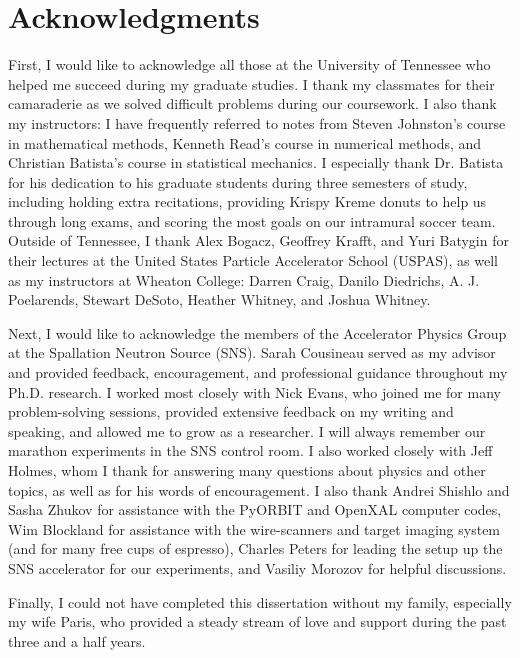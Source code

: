 \chapter*{Acknowledgments} 

First, I would like to acknowledge all those at the University of Tennessee who helped me succeed during my graduate studies. I thank my classmates for their camaraderie as we solved difficult problems during our coursework. I also thank my instructors: I have frequently referred to notes from Steven Johnston’s course in mathematical methods, Kenneth Read’s course in numerical methods, and Christian Batista’s course in statistical mechanics. I especially thank Dr. Batista for his dedication to his graduate students during three semesters of study, including holding extra recitations, providing Krispy Kreme donuts to help us through long exams, and scoring the most goals on our intramural soccer team. Outside of Tennessee, I thank Alex Bogacz, Geoffrey Krafft, and Yuri Batygin for their lectures at the United States Particle Accelerator School (USPAS), as well as my instructors at Wheaton College: Darren Craig, Danilo Diedrichs, A. J. Poelarends, Stewart DeSoto, Heather Whitney, and Joshua Whitney. 

Next, I would like to acknowledge the members of the Accelerator Physics Group at the Spallation Neutron Source (SNS). Sarah Cousineau served as my advisor and provided feedback, encouragement, and professional guidance throughout my Ph.D. research. I worked most closely with Nick Evans, who joined me for many problem-solving sessions, provided extensive feedback on my writing and speaking, and allowed me to grow as a researcher. I will always remember our marathon experiments in the SNS control room. I also worked closely with Jeff Holmes, whom I thank for answering many questions about physics and other topics, as well as for his words of encouragement. I also thank Andrei Shishlo and Sasha Zhukov for assistance with the PyORBIT and OpenXAL computer codes, Wim Blockland for assistance with the wire-scanners and target imaging system (and for many free cups of espresso), Charles Peters for leading the setup up the SNS accelerator for our experiments, and Vasiliy Morozov for helpful discussions.

Finally, I could not have completed this dissertation without my family, especially my wife Paris, who provided a steady stream of love and support during the past three and a half years.